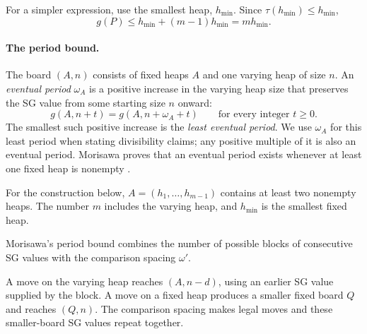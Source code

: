 \documentclass[10pt,a4paper]{article}
\begin{document}
For a simpler expression, use the smallest heap, $h_{\min}$.
Since $\tau(h_{\min})\le h_{\min}$,
\[
 g(P)\le h_{\min}+(m-1)h_{\min}=mh_{\min}.
\]

\paragraph{The period bound.}
The board $(A,n)$ consists of fixed heaps $A$ and one varying
heap of size $n$. An \emph{eventual period} $\omega_A$ is a
positive increase in the varying heap size that preserves the
SG value from some starting size $n$ onward:
\[
 \boxed{
 g(A,n+t)=g(A,n+\omega_A+t)
 \qquad\text{for every integer }t\ge0.
 }
\]
The smallest such positive increase is the \emph{least eventual period}.
We use $\omega_A$ for this least period when stating divisibility claims;
any positive multiple of it is also an eventual period.
Morisawa proves that an eventual period exists whenever at least
one fixed heap is nonempty
\cite[Theorem 2.5]{Morisawa2026}.

For the construction below, $A=(h_1,\ldots,h_{m-1})$ contains
at least two nonempty heaps. The number $m$ includes the varying
heap, and $h_{\min}$ is the smallest fixed heap.

Morisawa's period bound combines the number of possible blocks
of consecutive SG values with the comparison spacing $\omega'$.

A move on the varying heap reaches $(A,n-d)$, using an earlier
SG value supplied by the block. A move on a fixed heap produces
a smaller fixed board $Q$ and reaches $(Q,n)$. The comparison
spacing makes legal moves and these smaller-board SG values
repeat together.
\end{document}
